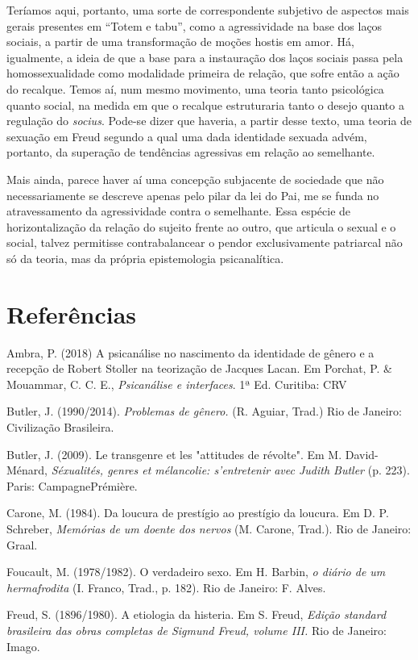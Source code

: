 Teríamos aqui, portanto, uma sorte de correspondente subjetivo de
aspectos mais gerais presentes em ``Totem e tabu'', como a agressividade
na base dos laços sociais, a partir de uma transformação de moções
hostis em amor. Há, igualmente, a ideia de que a base para a instauração
dos laços sociais passa pela homossexualidade como modalidade primeira
de relação, que sofre então a ação do recalque. Temos aí, num mesmo
movimento, uma teoria tanto psicológica quanto social, na medida em que
o recalque estruturaria tanto o desejo quanto a regulação do
\emph{socius}. Pode-se dizer que haveria, a partir desse texto, uma
teoria de sexuação em Freud segundo a qual uma dada identidade sexuada
advém, portanto, da superação de tendências agressivas em relação ao
semelhante.

Mais ainda, parece haver aí uma concepção subjacente de sociedade que
não necessariamente se descreve apenas pelo pilar da lei do Pai, me se
funda no atravessamento da agressividade contra o semelhante. Essa
espécie de horizontalização da relação do sujeito frente ao outro, que
articula o sexual e o social, talvez permitisse contrabalancear o pendor
exclusivamente patriarcal não só da teoria, mas da própria epistemologia
psicanalítica.

\section{Referências}

Ambra, P. (2018) A psicanálise no nascimento da identidade de gênero e a
recepção de Robert Stoller na teorização de Jacques Lacan. Em Porchat,
P. \& Mouammar, C. C. E., \emph{Psicanálise e interfaces}. 1ª Ed.
Curitiba: CRV

Butler, J. (1990/2014). \emph{Problemas de gênero.} (R. Aguiar, Trad.)
Rio de Janeiro: Civilização Brasileira.

Butler, J. (2009). Le transgenre et les "attitudes de révolte". Em M.
David-Ménard, \emph{Séxualités, genres et mélancolie: s'entretenir avec
Judith Butler} (p. 223). Paris: CampagnePrémière.

Carone, M. (1984). Da loucura de prestígio ao prestígio da loucura. Em
D. P. Schreber, \emph{Memórias de um doente dos nervos} (M. Carone,
Trad.). Rio de Janeiro: Graal.

Foucault, M. (1978/1982). O verdadeiro sexo. Em H. Barbin, \emph{o
diário de um hermafrodita} (I. Franco, Trad., p. 182). Rio de Janeiro:
F. Alves.

Freud, S. (1896/1980). A etiologia da histeria. Em S. Freud,
\emph{Edição standard brasileira das obras completas de Sigmund Freud,
volume III.} Rio de Janeiro: Imago.

